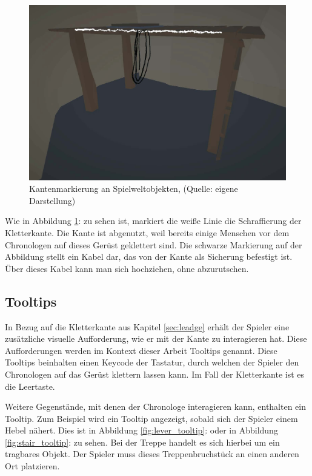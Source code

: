 \begin{figure}[ht]
\centering
\includegraphics[width=0.8\linewidth]{content/pictures/leadge_wireframe.jpg}
\caption{Kantenmarkierung an Spielweltobjekten, (Quelle: eigene Darstellung)}
\label{fig:leadge}
\end{figure}

Wie in Abbildung \ref{fig:leadge}:  zu sehen ist, markiert die weiße Linie die Schraffierung der Kletterkante. Die Kante ist abgenutzt, weil bereits einige Menschen vor dem Chronologen auf dieses Gerüst geklettert sind. 
Die schwarze Markierung auf der Abbildung stellt ein Kabel dar, das von der Kante als Sicherung befestigt ist. Über dieses Kabel kann man sich hochziehen, ohne abzurutschen.

\subsection{Tooltips}\label{sec:tooltip}

In Bezug auf die Kletterkante aus Kapitel \ref{sec:leadge}  erhält der Spieler eine zusätzliche visuelle Aufforderung, wie er mit der Kante zu interagieren hat. Diese Aufforderungen werden im Kontext dieser Arbeit Tooltips genannt. Diese Tooltips beinhalten einen Keycode der Tastatur, durch welchen der Spieler den Chronologen auf das Gerüst klettern lassen kann. Im Fall der Kletterkante ist es die Leertaste.

Weitere Gegenstände, mit denen der Chronologe interagieren kann, enthalten ein Tooltip. Zum Beispiel wird ein Tooltip angezeigt, sobald sich der Spieler einem Hebel nähert. Dies ist in Abbildung \ref{fig:lever_tooltip}:  oder in Abbildung \ref{fig:stair_tooltip}:  zu sehen. Bei der Treppe handelt es sich hierbei um ein tragbares Objekt. Der Spieler muss dieses Treppenbruchstück an einen anderen Ort platzieren.

